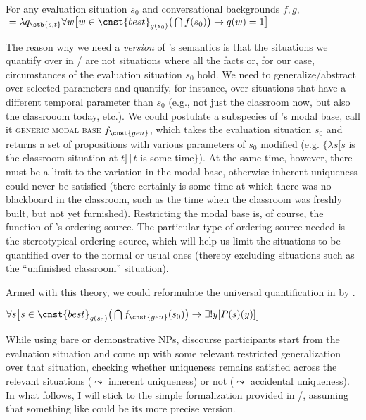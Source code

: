 \documentclass[output=paper,colorlinks,citecolor=brown,newtxmath]{langscibook}
\begin{document}
\ea For any evaluation situation $s_0$ and conversational backgrounds $f,g,$
${}=\lambda q_{\stb{s,t}}\forall w\big[w\in\cnst{best}_{g(s_0)}\big(\bigcap f(s_0)\big)\rightarrow q(w)=1\big]$\label{simik:def:kratzer-must}
\z

\noindent The reason why we need a \textit{version} of \citeauthor{Kratzer1981}'s semantics is that the situations we quantify over in / are not situations where all the facts or, for our case, circumstances of the evaluation situation $s_0$ hold. We need to generalize/abstract over selected parameters and quantify, for instance, over situations that have a different temporal parameter than $s_0$ (e.g., not just the classroom now, but also the classrooom today, etc.). We could postulate a subspecies of \citeauthor{Kratzer1981}'s modal base, call it \textsc{generic modal base} $f_{\cnst{gen}}$, which takes the evaluation situation $s_0$ and returns a set of propositions with various parameters of $s_0$ modified (e.g. $\{\lambda s[s$ is the classroom situation at $t]\,\vert\,t$ is some time$\}$). At the same time, however, there must be a limit to the variation in the modal base, otherwise inherent uniqueness could never be satisfied (there certainly is some time at which there was no blackboard in the classroom, such as the time when the classroom was freshly built, but not yet furnished). Restricting the modal base is, of course, the function of \citeauthor{Kratzer1981}'s ordering source. The particular type of ordering source needed is the stereotypical ordering source, which will help us limit the situations to be quantified over to the normal or usual ones (thereby excluding situations such as the ``unfinished classroom'' situation).

Armed with this theory, we could reformulate the universal quantification in  by .

\ea $\forall s\big[s\in\cnst{best}_{g(s_0)}\big(\bigcap f_{\cnst{gen}}(s_0)\big)\rightarrow \exists!y[P(s)(y)]\big]$
\label{simik:def:modal}
\z

\noindent While using bare or demonstrative NPs, discourse participants start from the evaluation situation and come up with some relevant restricted generalization over that situation, checking whether uniqueness remains satisfied across the relevant situations ($\leadsto$ inherent uniqueness) or not ($\leadsto$ accidental uniqueness). In what follows, I will stick to the simple formalization provided in /, assuming that something like  could be its more precise version.
\end{document}
